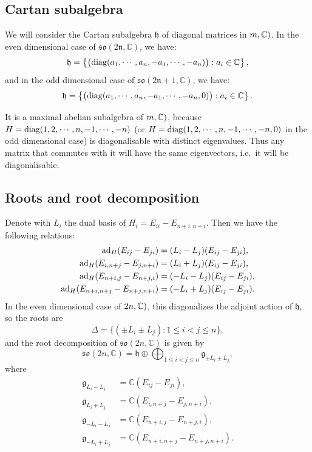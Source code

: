 \documentclass{report}
\begin{document}
\subsection{Cartan subalgebra}
We will consider the Cartan subalgebra $\mathfrak h$ of diagonal matrices in $\so(m, \mathbb C)$.
In the even dimensional case of $\mathfrak{so(2n, \mathbb C)}$, we have:
\[
\mathfrak h = \left\{
    \begin{pmatrix}
        \operatorname{diag}(a_1,\cdots, a_n, -a_1,\cdots, -a_n)
    \end{pmatrix} : a_i \in \mathbb{C}    
\right\},
\]
and in the odd dimensional case of $\mathfrak{so(2n + 1, \mathbb C)}$, we have:
\[
\mathfrak h = \left\{
    \begin{pmatrix}
        \operatorname{diag}(a_1,\cdots, a_n, -a_1,\cdots, -a_n, 0)
    \end{pmatrix} : a_i \in \mathbb{C}    
\right\}.
\]

It is a maximal abelian subalgebra of $\so(m, \mathbb C)$, because $H = \operatorname{diag}(1, 2, \cdots, n, -1, \cdots, -n)$ (or $ H = \operatorname{diag}(1, 2, \cdots, n, -1, \cdots, -n, 0)$ in the odd dimensional case) is diagonalisable with distinct eigenvalues.
Thus any matrix that commutes with it will have the same eigenvectors, i.e.\ it will be diagonalisable.

\subsection{Roots and root decomposition}
Denote with $L_i$ the dual basis of $H_i = E_{ii} - E_{n+i,n+i}$.
Then we have the following relations:
\begin{align*}
    \operatorname{ad}_{H}(E_{ij} - E_{ji}) &= (L_i - L_j)(E_{ij} - E_{ji}),\\
    \operatorname{ad}_{H}(E_{i,n+j} - E_{j,n+i}) &= (L_i + L_j)(E_{ij} - E_{ji}),\\
    \operatorname{ad}_{H}(E_{n+i,j} - E_{n+j,i}) &= (-L_i - L_j)(E_{ij} - E_{ji}),\\
    \operatorname{ad}_{H}(E_{n+i,n+j} - E_{n+j,n+i}) &= (-L_i + L_j)(E_{ij} - E_{ji}).
\end{align*}
In the even dimensional case of $\so(2n, \mathbb C)$, this diagonalizes the adjoint action of $\mathfrak h$, so the roots are
\[
\Delta = \{ (\pm L_i \pm L_j) : 1 \leq i < j \leq n \},
\]
and the root decomposition of $\mathfrak{so}(2n, \mathbb C)$ is given by
\[
\mathfrak{so}(2n,\mathbb C) = \mathfrak h \oplus \bigoplus_{1 \leq i < j \leq n} \mathfrak g_{\pm L_i \pm L_j},
\]
where
\begin{align*}
    \mathfrak g_{L_i - L_j} &= \mathbb C \left( E_{ij} - E_{ji} \right),\\
    \mathfrak g_{L_i + L_j} &= \mathbb C \left( E_{i,n+j} - E_{j,n+i} \right),\\
    \mathfrak g_{-L_i - L_j} &= \mathbb C \left( E_{n+i,j} - E_{n+j,i} \right),\\
    \mathfrak g_{-L_i + L_j} &= \mathbb C \left( E_{n+i,n+j} - E_{n+j,n+i} \right).
\end{align*}
\end{document}
